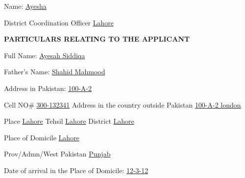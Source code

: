 \documentclass{article}
\begin{document}
Name: \underline{\hspace{1cm}Ayesha\hspace{1cm}}

District Coordination Officer \underline{\hspace{1cm}Lahore\hspace{1cm}}

\vspace{0.5cm}

\hrulefill
\begin{center}
\textbf{PARTICULARS RELATING TO THE APPLICANT}
\end{center}
\hrulefill

\vspace{0.5cm}

Full Name: \underline{\hspace{1cm}Ayesah Siddiqa\hspace{1cm}}

Father's Name: \underline{\hspace{1cm}Shahid Mahmood\hspace{1cm}}

Address in Pakistan: \underline{\hspace{1cm}100-A-2\hspace{1cm}}

Cell NO\# \underline{\hspace{1cm}300-132341\hspace{1cm}} Address in the country outside Pakistan \underline{\hspace{1cm}100-A-2 london\hspace{1cm}}

Place \underline{\hspace{1cm}Lahore\hspace{1cm}} Tehsil \underline{\hspace{1cm}Lahore\hspace{1cm}} District \underline{\hspace{1cm}Lahore\hspace{1cm}}

Place of Domicile \underline{\hspace{1cm}Lahore\hspace{1cm}}

Prov/Admn/West Pakistan \underline{\hspace{1cm}Punjab\hspace{1cm}}

Date of arrival in the Place of Domicile: \underline{\hspace{1cm}12-3-12\hspace{1cm}}
\end{document}
